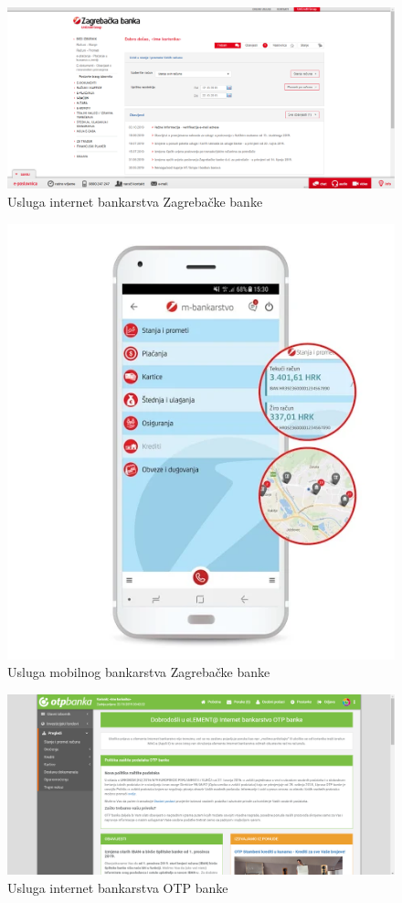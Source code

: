 		\begin{figure}[H]
			\includegraphics[scale=0.4]{slike/ezaba.PNG}
			\centering
			\caption{Usluga internet bankarstva Zagrebačke banke}
			\label{fig:ezaba}
		\end{figure}
	
		\begin{figure}[H]
			\includegraphics[scale=1]{slike/mzaba.PNG}
			\centering
			\caption{Usluga mobilnog bankarstva Zagrebačke banke}
			\label{fig:mzaba}
		\end{figure}
	
		\begin{figure}[H]
			\includegraphics[scale=0.4]{slike/otp.PNG}
			\centering
			\caption{Usluga internet bankarstva OTP banke}
			\label{fig:otp}
		\end{figure}
		
		\eject
